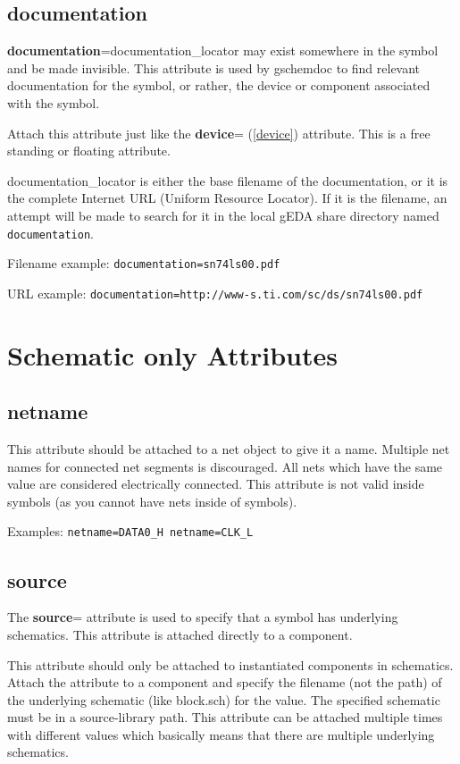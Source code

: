 \documentclass{article}
\begin{document}
\subsection{\bf documentation\label{documentation}}
{\bf documentation}=documentation\_locator may exist somewhere in the 
symbol and be made invisible.  This attribute is used by gschemdoc to 
find relevant documentation for the symbol, or rather, the device or 
component associated with the symbol.

Attach this attribute just like the {\bf device}= (\ref{device})
attribute.  This is a free standing or floating attribute.

documentation\_locator is either the base filename of the documentation,
or it is the complete Internet URL (Uniform Resource Locator). If it
is the filename, an attempt will be made to search for it in the local
gEDA share directory named \texttt{documentation}.

Filename example: \texttt{documentation=sn74ls00.pdf}

URL example: \texttt{documentation=http://www-s.ti.com/sc/ds/sn74ls00.pdf}


\section{Schematic only Attributes}

\subsection{{\bf netname}\label{netname}}
This attribute should be attached to a net object to give it a name.
Multiple net names for connected net segments is discouraged.  All nets
which have the same value are considered electrically connected.  This
attribute is not valid inside symbols (as you cannot have nets inside
of symbols).

Examples: \texttt{netname=DATA0\_H netname=CLK\_L}


\subsection{{\bf source}\label{source}}
The {\bf source}= attribute is used to specify that a symbol has underlying
schematics.  This attribute is attached directly to a component.

This attribute should only be attached to instantiated components
in schematics.  Attach the attribute to a component and specify the
filename (not the path) of the underlying schematic (like block.sch)
for the value.  The specified schematic must be in a source-library path.
This attribute can be attached multiple times with different values
which basically means that there are multiple underlying schematics.
\end{document}
